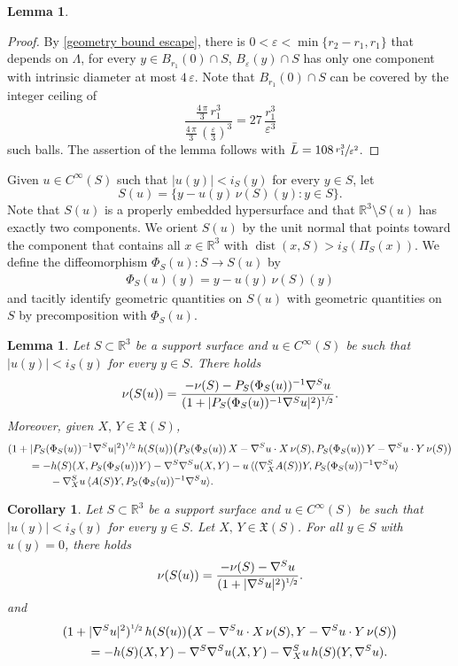 \documentclass[11pt]{amsart}
\newtheorem{lem}[prop]{Lemma}
\newtheorem{coro}[prop]{Corollary}
\begin{document}
\begin{appendices}
\begin{lem}
\end{lem}
\begin{proof}
	By \eqref{geometry bound escape}, there is $0<\varepsilon<\min\{r_2-r_1,r_1\}$ that depends on $\Lambda$, for every $y\in B_{r_1}(0)\cap S$, $B_{\varepsilon}(y)\cap S$ has only one component with intrinsic diameter at most $4\,\varepsilon$.  Note that  $B_{r_1}(0)\cap S$ can be covered by the integer ceiling of $$\frac{\frac{4\,\pi}{3}\,r_1^3}{\frac{4\,\pi}{3}\,\left(\frac{\varepsilon}{3}\right)^3}=27\,\frac{r_1^3}{\varepsilon^3}$$ such balls. The assertion of the lemma follows with $\bar L= 108\,\sfrac{r_1^3}{\varepsilon^2}$.
\end{proof}
Given $u \in C^\infty(S)$ such that  $|u(y)|<i_S(y)$ for every $y\in S$, let $$S(u)=\{y-u(y)\,\nu(S)(y):y\in S\}.$$ Note that $S(u)$ is a properly embedded hypersurface and that $\mathbb{R}^3\setminus S(u)$ has exactly two components. We orient $S(u)$ by the unit normal that points toward the component that contains all $x\in \mathbb{R}^3$ with $\operatorname{dist}(x,S)>i_S(\Pi_S(x))$. We define the diffeomorphism $\Phi_S(u):S\to S(u)$ by 
\begin{align} \label{Phi S} \Phi_S(u)(y)=y-u(y)\,\nu(S)(y)
	\end{align}  
and tacitly identify geometric quantities on $S(u)$ with geometric quantities on  $S$ by precomposition with $\Phi_S(u)$. 
 	\begin{lem} \label{graph}
 		Let $S\subset \mathbb{R}^3$ be a support surface and $u \in C^\infty(S)$ be such that  $|u(y)|<i_S(y)$ for every $y\in S$. There holds 
 		$$
 		\nu(S(u))=\frac{-\nu(S)-P_S(\Phi_S(u))^{-1}\nabla^S u}{(1+|P_S(\Phi_S(u))^{-1}\nabla^S u|^2)^{\sfrac12}}.
 		$$	
 		Moreover, given  $X,\,Y\in \mathfrak{X}(S)$,
 		\begin{align*}
 	&(1+|P_S(\Phi_S(u))^{-1}\nabla^S u|^2)^{\sfrac12}\,h(S(u))\big(P_S(\Phi_S(u))\,X-\nabla^S u\cdot X\,\nu(S),P_S(\Phi_S(u))\,Y-\nabla^S u\cdot Y\,\nu(S)\big)
 	\\&\qquad =-h(S)(X,P_S(\Phi_S(u))Y)
 	 -\nabla^S\nabla^S u(X,Y) -u\,\langle(\nabla^S_XA(S))Y,P_S(\Phi_S(u))^{-1}\nabla^S u\rangle\\&\qquad \qquad -\nabla^S_Xu\,\langle A(S)Y,P_S(\Phi_S(u))^{-1}\nabla^S u\rangle.	
 		\end{align*}
 	
 	\end{lem}
 		\begin{coro} \label{graph 2}
 		Let $S\subset \mathbb{R}^3$ be a support surface and $u \in C^\infty(S)$ be such that  $|u(y)|<i_S(y)$ for every $y\in S$. Let $X,\,Y\in \mathfrak{X}(S)$.  For all $y\in S$ with $u(y)=0$,  there holds 
 		$$
 		\nu(S(u))=\frac{-\nu(S)-\nabla^S u}{(1+|\nabla^S u|^2)^{\sfrac12}}.
 		$$	
 		and	\begin{align*}
 			&(1+|\nabla^S u|^2)^{\sfrac12}\,h(S(u))\big(X-\nabla^S u\cdot X\,\nu(S),Y-\nabla^S u\cdot Y\,\nu(S)\big)
 			\\&\qquad =-h(S)(X,Y)
 			-\nabla^S\nabla^S u(X,Y)  -\nabla^S_Xu\,h(S)(Y,\nabla^S u).	
 		\end{align*}
 		

\end{coro}
\end{appendices}
\end{document}

